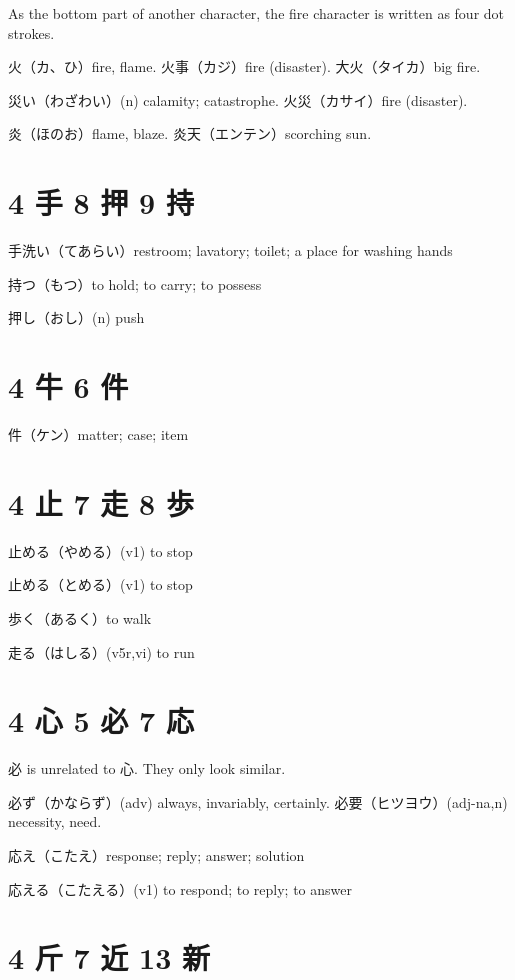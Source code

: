 As the bottom part of another character,
the fire character is written as four dot strokes.

火（カ、ひ）fire, flame.
火事（カジ）fire (disaster).
大火（タイカ）big fire.

災い（わざわい）(n) calamity; catastrophe.
火災（カサイ）fire (disaster).

炎（ほのお）flame, blaze.
炎天（エンテン）scorching sun.

\section{4 手 8 押 9 持}

手洗い（てあらい）restroom; lavatory; toilet; a place for washing hands

持つ（もつ）to hold; to carry; to possess

押し（おし）(n) push

\section{4 牛 6 件}

件（ケン）matter; case; item

\section{4 止 7 走 8 歩}

止める（やめる）(v1) to stop

止める（とめる）(v1) to stop

歩く（あるく）to walk

走る（はしる）(v5r,vi) to run

\section{4 心 5 必 7 応}

必 is unrelated to 心. They only look similar.

必ず（かならず）(adv) always, invariably, certainly.
必要（ヒツヨウ）(adj-na,n) necessity, need.

応え（こたえ）response; reply; answer; solution

応える（こたえる）(v1) to respond; to reply; to answer

\section{4 斤 7 近 13 新}

